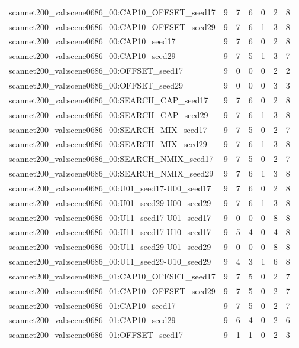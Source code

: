 \begin{table}[t]
\begin{tabular}{lrrrrrr}
scannet200\_val:scene0686\_00:CAP10\_OFFSET\_seed17 & 9 & 7 & 6 & 0 & 2 & 8 \\
scannet200\_val:scene0686\_00:CAP10\_OFFSET\_seed29 & 9 & 7 & 6 & 1 & 3 & 8 \\
scannet200\_val:scene0686\_00:CAP10\_seed17 & 9 & 7 & 6 & 0 & 2 & 8 \\
scannet200\_val:scene0686\_00:CAP10\_seed29 & 9 & 7 & 5 & 1 & 3 & 7 \\
scannet200\_val:scene0686\_00:OFFSET\_seed17 & 9 & 0 & 0 & 0 & 2 & 2 \\
scannet200\_val:scene0686\_00:OFFSET\_seed29 & 9 & 0 & 0 & 0 & 3 & 3 \\
scannet200\_val:scene0686\_00:SEARCH\_CAP\_seed17 & 9 & 7 & 6 & 0 & 2 & 8 \\
scannet200\_val:scene0686\_00:SEARCH\_CAP\_seed29 & 9 & 7 & 6 & 1 & 3 & 8 \\
scannet200\_val:scene0686\_00:SEARCH\_MIX\_seed17 & 9 & 7 & 5 & 0 & 2 & 7 \\
scannet200\_val:scene0686\_00:SEARCH\_MIX\_seed29 & 9 & 7 & 6 & 1 & 3 & 8 \\
scannet200\_val:scene0686\_00:SEARCH\_NMIX\_seed17 & 9 & 7 & 5 & 0 & 2 & 7 \\
scannet200\_val:scene0686\_00:SEARCH\_NMIX\_seed29 & 9 & 7 & 6 & 1 & 3 & 8 \\
scannet200\_val:scene0686\_00:U01\_seed17-U00\_seed17 & 9 & 7 & 6 & 0 & 2 & 8 \\
scannet200\_val:scene0686\_00:U01\_seed29-U00\_seed29 & 9 & 7 & 6 & 1 & 3 & 8 \\
scannet200\_val:scene0686\_00:U11\_seed17-U01\_seed17 & 9 & 0 & 0 & 0 & 8 & 8 \\
scannet200\_val:scene0686\_00:U11\_seed17-U10\_seed17 & 9 & 5 & 4 & 0 & 4 & 8 \\
scannet200\_val:scene0686\_00:U11\_seed29-U01\_seed29 & 9 & 0 & 0 & 0 & 8 & 8 \\
scannet200\_val:scene0686\_00:U11\_seed29-U10\_seed29 & 9 & 4 & 3 & 1 & 6 & 8 \\
scannet200\_val:scene0686\_01:CAP10\_OFFSET\_seed17 & 9 & 7 & 5 & 0 & 2 & 7 \\
scannet200\_val:scene0686\_01:CAP10\_OFFSET\_seed29 & 9 & 7 & 5 & 0 & 2 & 7 \\
scannet200\_val:scene0686\_01:CAP10\_seed17 & 9 & 7 & 5 & 0 & 2 & 7 \\
scannet200\_val:scene0686\_01:CAP10\_seed29 & 9 & 6 & 4 & 0 & 2 & 6 \\
scannet200\_val:scene0686\_01:OFFSET\_seed17 & 9 & 1 & 1 & 0 & 2 & 3 \\

\end{tabular}
\end{table}
